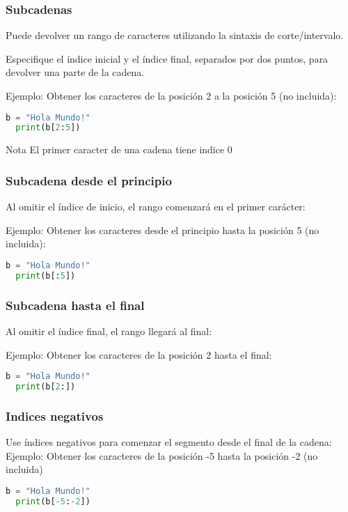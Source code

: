 \begin{frame}[fragile]
  \frametitle{Subcadenas}

  Puede devolver un rango de caracteres utilizando la sintaxis de
  corte/intervalo.

  \vspace{\baselineskip}
  Especifique el índice inicial y el índice final, separados por dos puntos,
  para devolver una parte de la cadena. 

  \vspace{\baselineskip}
  Ejemplo: Obtener los caracteres de la posición 2 a la posición 5 (no incluida):
  \begin{lstlisting}[language=Python]
  b = "Hola Mundo!"
  print(b[2:5])
  \end{lstlisting}

  \begin{exampleblock}{Nota}
    El primer caracter de una cadena tiene indice 0
  \end{exampleblock}
\end{frame}

\begin{frame}[fragile]
  \frametitle{Subcadena desde el principio}

  Al omitir el índice de inicio, el rango comenzará en el primer carácter:

  \vspace{\baselineskip}
  Ejemplo: Obtener los caracteres desde el principio hasta la posición 5 (no incluida):
  \begin{lstlisting}[language=Python]
  b = "Hola Mundo!"
  print(b[:5])
  \end{lstlisting}
\end{frame}

\begin{frame}[fragile]
  \frametitle{Subcadena hasta el final}

  Al omitir el índice final, el rango llegará al final:

  \vspace{\baselineskip}
  Ejemplo: Obtener los caracteres de la posición 2 hasta el final:
  \begin{lstlisting}[language=Python]
  b = "Hola Mundo!"
  print(b[2:])
  \end{lstlisting}
\end{frame}

\begin{frame}[fragile]
  \frametitle{Indices negativos}

  Use índices negativos para comenzar el segmento desde el final de la cadena:
  \vspace{\baselineskip}
  Ejemplo: Obtener los caracteres de la posición -5 hasta la posición -2 (no
  incluida)
  \begin{lstlisting}[language=Python]
  b = "Hola Mundo!"
  print(b[-5:-2])
  \end{lstlisting}
\end{frame}



